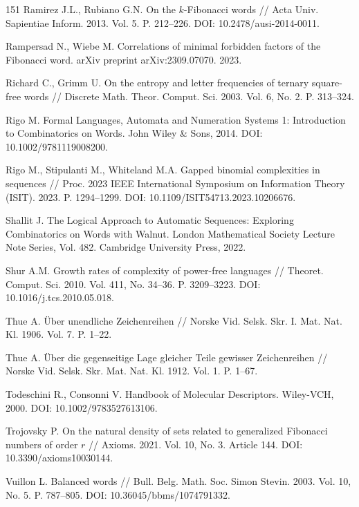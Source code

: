 \documentclass[a4paper,14pt]{extreport}
\theoremstyle{plain}
\theoremstyle{definition}
\theoremstyle{remark}
\begin{document}
\begin{thebibliography}{151}
		Ramirez J.L., Rubiano G.N. On the $k$-Fibonacci words // Acta Univ. Sapientiae Inform. 2013. Vol. 5. P. 212--226. DOI: 10.2478/ausi-2014-0011.
		
		Rampersad N., Wiebe M. Correlations of minimal forbidden factors of the Fibonacci word. arXiv preprint arXiv:2309.07070. 2023.
		
		Richard C., Grimm U. On the entropy and letter frequencies of ternary square-free words // Discrete Math. Theor. Comput. Sci. 2003. Vol. 6, No. 2. P. 313--324.
		
		Rigo M. Formal Languages, Automata and Numeration Systems 1: Introduction to Combinatorics on Words. John Wiley \& Sons, 2014. DOI: 10.1002/9781119008200.
		
		Rigo M., Stipulanti M., Whiteland M.A. Gapped binomial complexities in sequences // Proc. 2023 IEEE International Symposium on Information Theory (ISIT). 2023. P. 1294--1299. DOI: 10.1109/ISIT54713.2023.10206676.
		
		Shallit J. The Logical Approach to Automatic Sequences: Exploring Combinatorics on Words with Walnut. London Mathematical Society Lecture Note Series, Vol. 482. Cambridge University Press, 2022.
		
		Shur A.M. Growth rates of complexity of power-free languages // Theoret. Comput. Sci. 2010. Vol. 411, No. 34--36. P. 3209--3223. DOI: 10.1016/j.tcs.2010.05.018.
		
		Thue A. Über unendliche Zeichenreihen // Norske Vid. Selsk. Skr. I. Mat. Nat. Kl. 1906. Vol. 7. P. 1--22.
		
		Thue A. Über die gegenseitige Lage gleicher Teile gewisser Zeichenreihen // Norske Vid. Selsk. Skr. Mat. Nat. Kl. 1912. Vol. 1. P. 1--67.
		
		Todeschini R., Consonni V. Handbook of Molecular Descriptors. Wiley-VCH, 2000. DOI: 10.1002/9783527613106.
		
		Trojovsky P. On the natural density of sets related to generalized Fibonacci numbers of order $r$ // Axioms. 2021. Vol. 10, No. 3. Article 144. DOI: 10.3390/axioms10030144.
		
		Vuillon L. Balanced words // Bull. Belg. Math. Soc. Simon Stevin. 2003. Vol. 10, No. 5. P. 787--805. DOI: 10.36045/bbms/1074791332.
		

\end{thebibliography}
\end{document}
